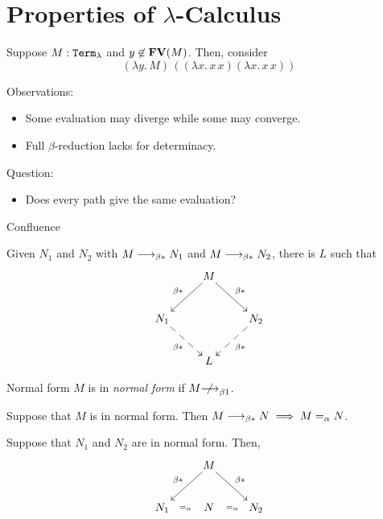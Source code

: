 \section{Properties of $\lambda$-Calculus}

\begin{frame}
  \begin{example}
    Suppose $M : \mathtt{Term}_\lambda$ and $y \not\in \mathbf{FV}(M)$. 
    Then, consider 
    \[
      (\lambda y.\, M)\, ((\lambda x.\, x\,x)(\lambda x.\, x\, x))
    \]
  \end{example}
  Observations:
  \begin{itemize}
    \item Some evaluation may diverge while some may converge.
    \item Full $\beta$-reduction lacks for determinacy. 
  \end{itemize}
  Question:
  \begin{itemize}
    \item Does every path give the same evaluation?
  \end{itemize}
\end{frame}

\begin{frame}{Confluence}
\begin{theorem}
  Given $N_1$ and $N_2$ with $M \longrightarrow_{\beta*} N_1$ and $M\longrightarrow_{\beta*} N_2$, there is $L$
  such that
  \[
    \xymatrix{
      & M \ar[rd]^{\beta*} \ar[ld]_{\beta*} \\
      N_1 \ar@{-->}[rd]_{\beta*} & & N_2 \ar@{-->}[ld]^{\beta*} \\
      & L
    }
  \]
\end{theorem}
\end{frame}

\begin{frame}{Normal form}
  $M$ is in \emph{normal form} if $M \notonereduce$. 

  \begin{lemma}
    Suppose that $M$ is in normal form. Then 
      $M \longrightarrow_{\beta*} N \implies M =_\alpha N$.
  \label{lem:normal-no-reduction}%
  \end{lemma}

  \begin{corollary}
    Suppose that $N_1$ and $N_2$ are in normal form. Then, 
    \[
      \xymatrix{
        & M \ar[rd]^{\beta*} \ar[ld]_{\beta*} \\
        N_1 \ar@{}[r]|{=_{\alpha}} & N & N_2 \ar@{}[l]|{=_\alpha} \\
      }
    \]
    \label{coro:uniqueness-normal}%
  \end{corollary}
\end{frame}

